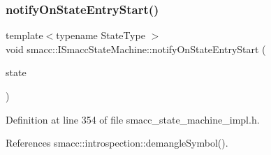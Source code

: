 \mbox{\label{classsmacc_1_1ISmaccStateMachine_aeec54e997d715b105ebfeb5caadc4fbf}} 
\subsubsection{\texorpdfstring{notify\+On\+State\+Entry\+Start()}{notifyOnStateEntryStart()}}
{\footnotesize\ttfamily template$<$typename State\+Type $>$ \\
void smacc\+::\+I\+Smacc\+State\+Machine\+::notify\+On\+State\+Entry\+Start (\begin{DoxyParamCaption}\item[{State\+Type $\ast$}]{state }\end{DoxyParamCaption})}



Definition at line 354 of file smacc\+\_\+state\+\_\+machine\+\_\+impl.\+h.



References smacc\+::introspection\+::demangle\+Symbol().


